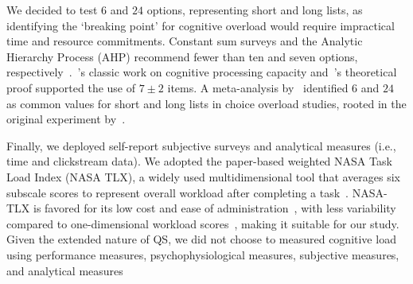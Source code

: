 We decided to test $6$ and $24$ options, representing short and long lists, as identifying the `breaking point' for cognitive overload would require impractical time and resource commitments. Constant sum surveys and the Analytic Hierarchy Process (AHP) recommend fewer than ten and seven options, respectively~\cite{moroneyQuestionnaireDesignHow2019, saatyGroupDecisionMaking2013, saatyPrinciplesAnalyticHierarchy1987}.~\textcite{millerMagicalNumberSeven1956}'s classic work on cognitive processing capacity and~\textcite{saaty2003magic}'s theoretical proof supported the use of $7\pm2$ items. A meta-analysis by~\textcite{chernevChoiceOverloadConceptual2015} identified $6$ and $24$ as common values for short and long lists in choice overload studies, rooted in the original experiment by~\textcite{iyengarWhenChoiceDemotivating2000}.

Finally, we deployed self-report subjective surveys and analytical measures (i.e., time and clickstream data). We adopted the paper-based weighted NASA Task Load Index (NASA TLX), a widely used multidimensional tool that averages six subscale scores to represent overall workload after completing a task~\cite{hart1988development, hartNasaTaskLoadIndex2006, cain2007review}. NASA-TLX is favored for its low cost and ease of administration~\cite{gaoMentalWorkloadMeasurement2013}, with less variability compared to one-dimensional workload scores~\cite{rubioEvaluationSubjectiveMental2004}, making it suitable for our study. Given the extended nature of QS, we did not choose to measured cognitive load using performance measures, psychophysiological measures, subjective measures, and analytical measures~\cite{gaoMentalWorkloadMeasurement2013}





